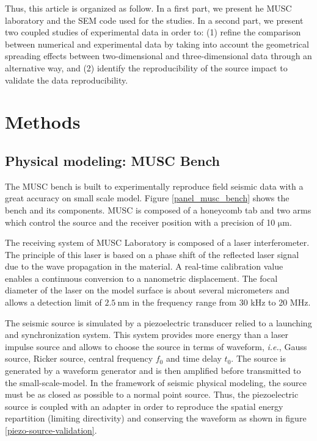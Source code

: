 \documentclass[manuscript,revised]{geophysics}
\newcommand{\twod}{two-dimensional }
\newcommand{\thrd}{three-dimensional }
\begin{document}

\noindent Thus, this article is organized as follow. In a first part, we present he MUSC laboratory and the SEM code used for the studies. In a second part, we present two coupled studies of experimental data in order to: (1) refine the comparison between numerical and experimental data by taking into account the geometrical spreading effects between \twod and \thrd data through an alternative way, and (2) identify the reproducibility of the source impact to validate the data reproducibility.


\section{Methods}

\subsection{Physical modeling: MUSC Bench}

\noindent The MUSC bench \citep{Bretaudeau_SSA_2008b,Bretaudeau_SSM_2011,Bretaudeau_FWI_2013} is built to experimentally reproduce field seismic data with a great accuracy on small scale model. Figure \ref{panel_musc_bench} shows the bench and its components. MUSC is composed of a honeycomb tab and two arms which control the source and the receiver position with a precision of 10 $\mathrm{\mu m}$.

\noindent The receiving system of MUSC Laboratory is composed of a laser interferometer. The principle of this laser is based on a phase shift of the reflected laser signal due to the wave propagation in the material. A real-time calibration value enables a continuous conversion to a nanometric displacement. The focal diameter of the laser on the model surface is about several micrometers and allows a detection limit of $\mathrm{2.5\ nm}$ in the frequency range from 30 kHz to 20 MHz.

\noindent The seismic source is simulated by a piezoelectric transducer relied to a launching and synchronization system. This system provides more energy than a laser impulse source \citep{Bretaudeau_PHD_2010,Bretaudeau_SSM_2011} and allows to choose the source in terms of waveform, \textit{i.e.}, Gauss source, Ricker source, central frequency $f_{0}$ and time delay $t_{0}$. The source is generated by a waveform generator and is then amplified before transmitted to the small-scale-model. In the framework of seismic physical modeling, the source must be as closed as possible to a normal point source. Thus, the piezoelectric source is coupled with an adapter in order to reproduce the spatial energy repartition (limiting directivity) and conserving the waveform as shown in figure \ref{piezo-source-validation}.
\end{document}
